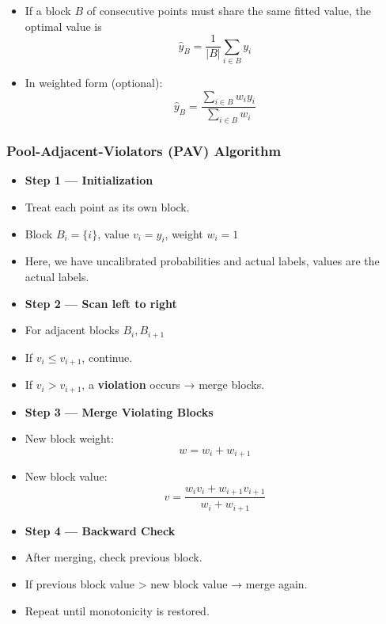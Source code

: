 \documentclass[10pt,a4paper]{article}
\begin{document}
	\begin{itemize}
		\item If a block \( B \) of consecutive points must share the same fitted value, the optimal value is
		$$ \hat{y}_B = \frac{1}{|B|} \sum_{i \in B} y_i $$
	\end{itemize}

	\begin{itemize}
		\item In weighted form (optional):
		$$ \hat{y}_B = \frac{\sum_{i \in B} w_i y_i}{\sum_{i \in B} w_i} $$
	\end{itemize}


	\subsubsection{Pool-Adjacent-Violators (PAV) Algorithm}

	\begin{itemize}
		\item \textbf{Step 1 — Initialization}
		\item Treat each point as its own block.
		\item Block $ B_i = \{i\} $, value $ v_i = y_i $, weight $ w_i = 1 $
		\item Here, we have uncalibrated probabilities and actual labels, values are the actual labels.
	\end{itemize}

	\begin{itemize}
		\item \textbf{Step 2 — Scan left to right}
		\item For adjacent blocks $ B_i, B_{i+1} $
		\item If $ v_i \le v_{i+1} $, continue.
		\item If $ v_i > v_{i+1} $, a \textbf{violation} occurs → merge blocks.
	\end{itemize}

	\begin{itemize}
		\item \textbf{Step 3 — Merge Violating Blocks}
		\item New block weight:
		$$ w = w_i + w_{i+1} $$
		\item New block value:
		$$ v = \frac{w_i v_i + w_{i+1} v_{i+1}}{w_i + w_{i+1}} $$
	\end{itemize}

	\begin{itemize}
		\item \textbf{Step 4 — Backward Check}
		\item After merging, check previous block.
		\item If previous block value > new block value → merge again.
		\item Repeat until monotonicity is restored.
	\end{itemize}
\end{document}
